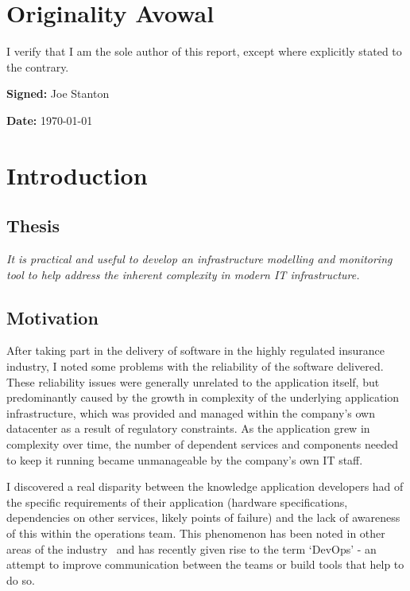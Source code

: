 \documentclass{cshonours}
\begin{document}
\chapter*{Originality Avowal}
I verify that I am the sole author of this report, except where explicitly stated to the contrary. 

\textbf{Signed:} Joe Stanton 

\textbf{Date:} \today


\tableofcontents

\chapter{Introduction}

\section{Thesis}
\textit{It is practical and useful to develop an infrastructure modelling and monitoring tool to help address the inherent complexity in modern IT infrastructure.}
\section{Motivation}

After taking part in the delivery of software in the highly regulated insurance industry, I noted some problems with the reliability of the software delivered. These reliability issues were generally unrelated to the application itself, but predominantly caused by the growth in complexity of the underlying application infrastructure, which was provided and managed within the company's own datacenter as a result of regulatory constraints. As the application grew in complexity over time, the number of dependent services and components needed to keep it running became unmanageable by the company's own IT staff.

I discovered a real disparity between the knowledge application developers had of the specific requirements of their application (hardware specifications, dependencies on other services, likely points of failure) and the lack of awareness of this within the operations team. This phenomenon has been noted in other areas of the industry~\cite{DevOps} and has recently given rise to the term `DevOps' - an attempt to improve communication between the teams or build tools that help to do so.
\end{document}
